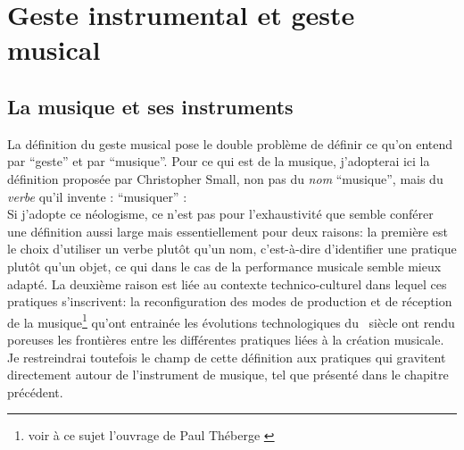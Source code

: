 
\section{Geste instrumental et geste musical}

\subsection{La musique et ses instruments}

\noindent La définition du geste musical pose le double problème de définir ce qu'on entend par ``geste'' et par ``musique''. Pour ce qui est de la musique, j'adopterai ici la définition proposée par Christopher Small, non pas du \textit{nom} ``musique'', mais du \textit{verbe} qu'il invente : ``musiquer'' \cite{small_musicking:_1998}:
\\
\indent Si j'adopte ce néologisme, ce n'est pas pour l'exhaustivité que semble conférer une définition aussi large mais essentiellement pour deux raisons: la première est le choix d'utiliser un verbe plutôt qu'un nom, c'est-à-dire d'identifier une pratique plutôt qu'un objet, ce qui dans le cas de la performance musicale semble mieux adapté. La deuxième raison est liée au contexte technico-culturel dans lequel ces pratiques s'inscrivent: la reconfiguration des modes de production et de réception de la musique\footnote{voir à ce sujet l'ouvrage de Paul Théberge \cite{theberge_any_1997}} qu'ont entrainée les évolutions technologiques du ~siècle ont rendu poreuses les frontières entre les différentes pratiques liées à la création musicale. Je restreindrai toutefois le champ de cette définition aux pratiques qui gravitent directement autour de l'instrument de musique, tel que présenté dans le chapitre précédent.\\
